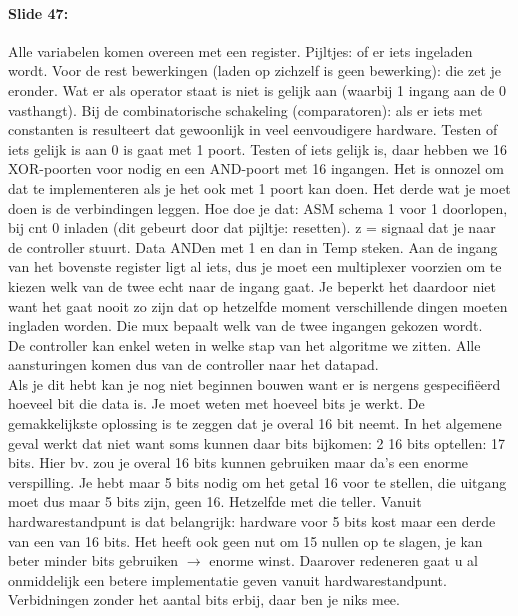 \documentclass[10pt,a4paper]{book}
\begin{document}
\paragraph{Slide 47:} Alle variabelen komen overeen met een register. Pijltjes: of er iets ingeladen wordt. Voor de rest bewerkingen (laden op zichzelf is geen bewerking): die zet je eronder. Wat er als operator staat is niet is gelijk aan (waarbij 1 ingang aan de 0 vasthangt). Bij de combinatorische schakeling (comparatoren): als er iets met constanten is resulteert dat gewoonlijk in veel eenvoudigere hardware. Testen of iets gelijk is aan 0 is gaat met 1 poort. Testen of iets gelijk is, daar hebben we 16 XOR-poorten voor nodig en een AND-poort met 16 ingangen. Het is onnozel om dat te implementeren als je het ook met 1 poort kan doen. Het derde wat je moet doen is de verbindingen leggen. Hoe doe je dat: ASM schema 1 voor 1 doorlopen, bij cnt 0 inladen (dit gebeurt door dat pijltje: resetten). z = signaal dat je naar de controller stuurt. Data ANDen met 1 en dan in Temp steken. Aan de ingang van het bovenste register ligt al iets, dus je moet een multiplexer voorzien om te kiezen welk van de twee echt naar de ingang gaat. Je beperkt het daardoor niet want het gaat nooit zo zijn dat op hetzelfde moment verschillende dingen moeten ingladen worden. Die mux bepaalt welk van de twee ingangen gekozen wordt.\\
De controller kan enkel weten in welke stap van het algoritme we zitten. Alle aansturingen komen dus van de controller naar het datapad.\\
Als je dit hebt kan je nog niet beginnen bouwen want er is nergens gespecifi\"eerd hoeveel bit die data is. Je moet weten met hoeveel bits je werkt. De gemakkelijkste oplossing is te zeggen dat je overal 16 bit neemt. In het algemene geval werkt dat niet want soms kunnen daar bits bijkomen: 2 16 bits optellen: 17 bits. Hier bv. zou je overal 16 bits kunnen gebruiken maar da's een enorme verspilling. Je hebt maar 5 bits nodig om het getal 16 voor te stellen, die uitgang moet dus maar 5 bits zijn, geen 16. Hetzelfde met die teller. Vanuit hardwarestandpunt is dat belangrijk: hardware voor 5 bits kost maar een derde van een van 16 bits. Het heeft ook geen nut om 15 nullen op te slagen, je kan beter minder bits gebruiken $\rightarrow$ enorme winst. Daarover redeneren gaat u al onmiddelijk een betere implementatie geven vanuit hardwarestandpunt.\\
Verbidningen zonder het aantal bits erbij, daar ben je niks mee.
\end{document}

